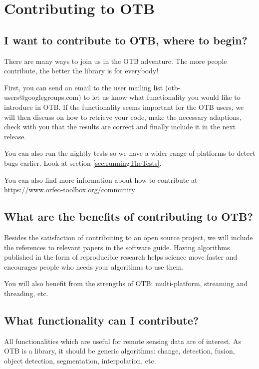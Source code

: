 \section{Contributing to OTB}\label{sec:contributing}

\subsection{I want to contribute to OTB, where to begin?}

There are many ways to join us in the OTB adventure. The more people
contribute, the better the library is for everybody!

First, you can send an email to the user mailing list (otb-users@googlegroups.com)
to let us know what functionality
you would like to introduce in OTB. If the functionality seems important for the
OTB users, we will then discuss on how to retrieve your code,
make the necessary adaptions, check with you that the results are correct and finally
include it in the next release.

You can also run the nightly tests so we have a wider range of platforms to detect
bugs earlier. Look at section \ref{sec:runningTheTests}.

You can also find more information about how to contribute at \url{https://www.orfeo-toolbox.org/community}

\subsection{What are the benefits of contributing to OTB?}

Besides the satisfaction of contributing to an open source project, we will include
the references to relevant papers in the software guide. Having algorithms
published in the form of reproducible research helps science move faster and
encourages people who needs your algorithms to use them.

You will also benefit from the strengths of OTB: multi-platform, streaming and
threading, etc.

\subsection{What functionality can I contribute?}

All functionalities which are useful for remote sensing data are of interest. As
OTB is a library, it should be generic algorithms: change, detection, fusion,
object detection, segmentation, interpolation, etc.

